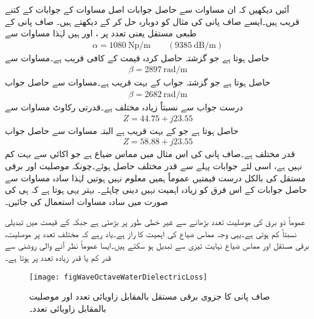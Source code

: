 آئیں دیکھیں کہ ان مساوات سے حاصل جوابات اصل مساوات کے جوابات کے کتنے قریب ہیں۔ایسے صاف پانی کی مثال کو دوبارہ حل کر کے دیکھتے ہیں۔ صاف پانی کے طبعی مستقل  یعنی   تعدد پر ،  اور  ہیں لہٰذا  مساوات  سے
\begin{align*}
\alpha =\SI{1080}{\neper \per \meter} \quad \quad (\SI{9385}{\deci\bel\per\meter})
\end{align*}
حاصل ہوتا ہے جو گزشتہ حاصل کردہ قیمت  کے کافی قریب ہے۔مساوات  سے
\begin{align*}
\beta=\SI{2897}{\radian \per \meter}
\end{align*}
حاصل ہوتا ہے جو گزشتہ جواب  کے بہت قریب ہے۔مساوات  سے حاصل جواب
\begin{align*}
\beta=\SI{2682}{\radian \per \meter}
\end{align*}
درست جواب سے نسبتاً زیادہ مختلف ہے۔قدرتی رکاوٹ مساوات  سے
\begin{align*}
Z=44.75+j 23.55
\end{align*}
حاصل ہوتا ہے جو  کے بہت قریب ہے البتہ مساوات  سے حاصل جواب
\begin{align*}
Z=58.88+j23.55
\end{align*}
قدر مختلف ہے۔صاف پانی کی اس مثال میں مماس ضیاع  ہے جو اکائی سے بہت کم نہیں ہے، اسی لئے جوابات پہلے سے قدر مختلف حاصل ہوئے۔چونکہ موصلیت اور برقی مستقل کی بالکل درست قیمتیں عموماً ہمیں معلوم نہیں ہوتیں لہٰذا سادہ مساوات سے حاصل جوابات کے اس فرق کو زیادہ اہمیت نہیں دینی چاہئے۔ بہتر یہی ہوتا ہے کہ  ہی کی صورت میں سادہ مساوات استعمال کی جائیں۔

عموماً ذو برق کی موصلیت تعدد بڑھانے  سے غیر خطی طور پر بڑھتی ہے جبکہ  کے قیمت میں تبدیلی نسبتاً  کم ہوتی ہے۔یہی وجہ مماس ضیاع کی اہمیت کا راز ہے۔یاد رہے کہ مختلف تعدد پر موصلیت، برقی مستقل اور مماس ضیاع نہایت تیزی سے تبدیل ہو سکتے ہیں۔ایسا عموماً نظر آنے والی روشنی سے قدر کم یا قدر زیادہ تعدد پر ہوتا ہے۔ 

\begin{figure}
\centering
\texttt{[image: figWaveOctaveWaterDielectricLoss]}
\caption{صاف پانی کا جزوی برقی مستقل بالمقابل زاویائی تعدد اور موصلیت بالمقابل زاویائی تعدد۔}
\label{شکل_موج_صاف_پانی_تعدد_بالمقابل_برقی_مستقل}
\end{figure}

